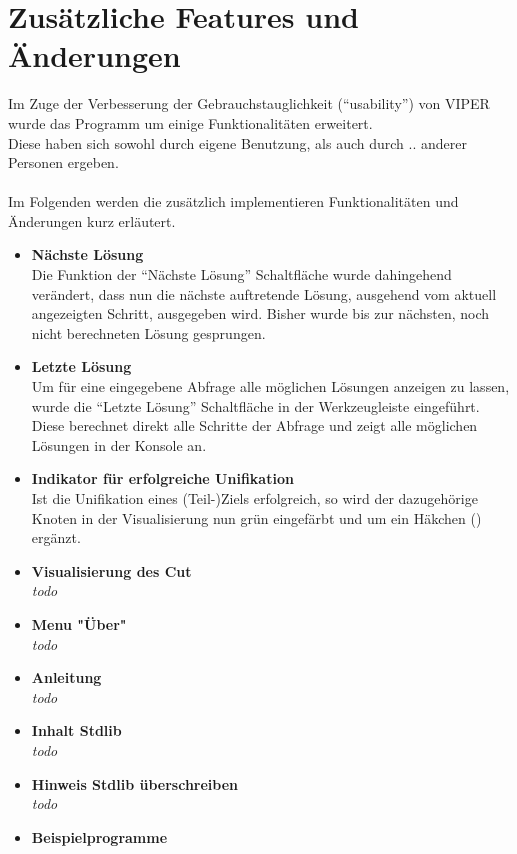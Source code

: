 \documentclass[parskip=full,11pt,twoside]{scrartcl}
\begin{document}
\section{Zusätzliche Features und Änderungen}

Im Zuge der Verbesserung der Gebrauchstauglichkeit (\enquote{usability}) von VIPER wurde das Programm um einige Funktionalitäten erweitert.\\
Diese haben sich sowohl durch eigene Benutzung, als auch durch .. anderer Personen ergeben.\\\\
Im Folgenden werden die zusätzlich implementieren Funktionalitäten und Änderungen kurz erläutert.

\begin{itemize}
  \item \textbf{Nächste Lösung}\\
        Die Funktion der \enquote{Nächste Lösung} Schaltfläche wurde dahingehend verändert, dass nun die nächste auftretende Lösung, ausgehend vom aktuell angezeigten Schritt, ausgegeben wird. Bisher wurde bis zur nächsten, noch nicht berechneten Lösung gesprungen.
  \item \textbf{Letzte Lösung}\\
        Um für eine eingegebene Abfrage alle möglichen Lösungen anzeigen zu lassen, wurde die \enquote{Letzte Lösung} Schaltfläche in der Werkzeugleiste eingeführt. Diese berechnet direkt alle Schritte der Abfrage und zeigt alle möglichen Lösungen in der Konsole an.
  \item \textbf{Indikator für erfolgreiche Unifikation}\\
        Ist die Unifikation eines (Teil-)Ziels erfolgreich, so wird der dazugehörige Knoten in der Visualisierung nun grün eingefärbt und um ein Häkchen () ergänzt.
  \item \textbf{Visualisierung des Cut}\\
        \textit{todo}
  \item \textbf{Menu "Über"}\\
        \textit{todo}
  \item \textbf{Anleitung}\\
        \textit{todo}
  \item \textbf{Inhalt Stdlib}\\
        \textit{todo}
  \item \textbf{Hinweis Stdlib überschreiben}\\
        \textit{todo}
  \item \textbf{Beispielprogramme}\\

\end{itemize}
\end{document}
